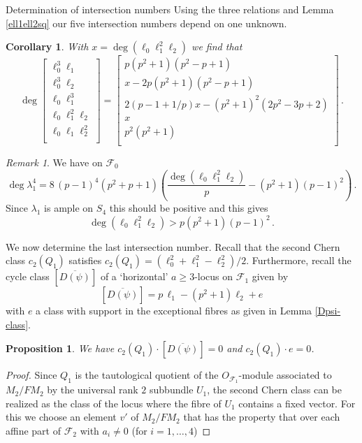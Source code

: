 \documentclass[11pt]{amsart}
\numberwithin{equation}{section}
\newtheorem{proposition}[theorem]{Proposition}
\newtheorem{corollary}[theorem]{Corollary}
\theoremstyle{definition}
\theoremstyle{remark}
\newtheorem{remark}[theorem]{Remark}
\begin{document}
\begin{section}{Determination of intersection numbers}
Using the three relations and
Lemma \ref{ell1ell2sq}  our five intersection numbers 
depend on one unknown.
\begin{corollary}\label{one-unknown}
With $x=\deg(\ell_0\ell_1^2\ell_2)$ we find that 
$$
\deg \left[ 
\begin{matrix} \ell_0^3\ell_1\\ \ell_0^3\ell_2\\ \ell_0\ell_1^3\\ \ell_0\ell_1^2\ell_2\\ \ell_0\ell_1\ell_2^2 \\
\end{matrix} \right] =
 \left[ 
\begin{matrix}
p(p^2+1)(p^2-p+1)\\ x-2p(p^2+1)(p^2-p+1)\\
2(p-1+1/p)x-(p^2+1)^2(2p^2-3p+2)\\ x \\ p^2(p^2+1) \\
\end{matrix} \right] \, .
$$
\end{corollary}
\begin{remark}
We have on $\mathcal{F}_0$
$$
\deg \lambda_1^4 = 8\, (p-1)^4 (p^2+p+1)\left(\frac{\deg(\ell_0\ell_1^2\ell_2)}{p} -(p^2+1)(p-1)^2\right) \, .
$$
Since $\lambda_1$ is ample on $S_4$ this should be positive and this gives
$$
\deg (\ell_0\ell_1^2\ell_2) > p(p^2+1)(p-1)^2 \, .
$$
\end{remark}
We now determine the last intersection number.
Recall that the second Chern class $c_2(Q_1)$ satisfies $c_2(Q_1)=(\ell_0^2+\ell_1^2-\ell_2^2)/2$.
Furthermore, recall the cycle class $[\overline{D(\psi)}]$
of a `horizontal' $a\geq 3$-locus on $\mathcal{F}_1$
given by 
$$
[\overline{D(\psi)}]=p\, \ell_1-(p^2+1)\ell_2+e
$$
with $e$ a class with support in the exceptional fibres as
given in Lemma \ref{Dpsi-class}.
\begin{proposition}
We have $c_2(Q_1)\cdot [\overline{D(\psi)}]=0$ and $c_2(Q_1)\cdot e=0$.
\end{proposition}
\begin{proof}
Since $Q_1$ is the tautological quotient of the
$O_{{\mathcal F}_1}$-module associated to $M_2/FM_2$ 
by the universal rank $2$ subbundle $U_1$, the second Chern class
can be realized as the class of the locus where the fibre of $U_1$ contains a
fixed vector. For this we choose an element $v'$ of $M_2/FM_2$ that has the property
that over each affine part of $\mathcal{F}_2$ with $a_i\neq 0$ (for $i=1,\ldots,4$)

\end{proof}
\end{section}
\end{document}
